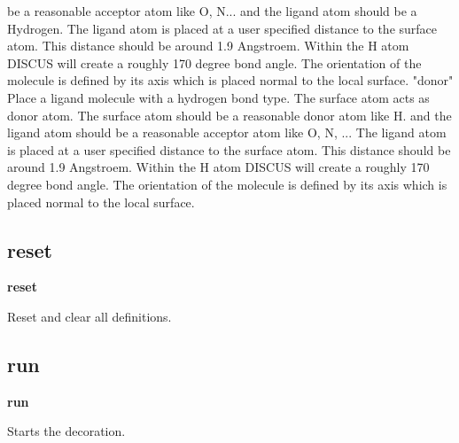            be a reasonable acceptor atom like O, N... and the ligand atom 
           should be a Hydrogen. 
           The ligand atom is placed at a user specified distance to the 
           surface atom. This distance should be around 1.9  Angstroem. 
           Within the H atom DISCUS will create a roughly 170 degree bond 
           angle. 
           The orientation of the molecule is defined by its axis which is 
           placed normal to the local surface. 
"donor"    Place a ligand molecule with a hydrogen bond type. 
           The surface atom acts as donor atom. The surface atom should 
           be a reasonable donor atom like H. and the ligand atom 
           should be a reasonable acceptor atom like O, N, ... 
           The ligand atom is placed at a user specified distance to the 
           surface atom. This distance should be around 1.9  Angstroem. 
           Within the H atom DISCUS will create a roughly 170 degree bond 
           angle. 
           The orientation of the molecule is defined by its axis which is 
           placed normal to the local surface. 
\par
\subsection*{reset}
{\bf reset \par }
\vspace{3pt}
Reset and clear all definitions. 
\subsection*{run}
{\bf run \par }
\vspace{3pt}
Starts the decoration. 
